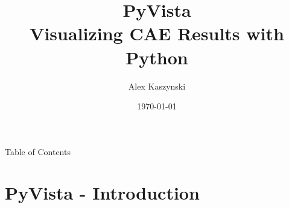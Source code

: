 \documentclass[t]{beamer}
\begin{document}

\title{PyVista \\
  Visualizing CAE Results with Python}
\author{Alex Kaszynski}
\date{\today}

\titleframe{}



\begin{frame}{Table of Contents}
  \tableofcontents
  \vspace{200pt}  %
\end{frame}

\section{PyVista - Introduction}
\end{document}
